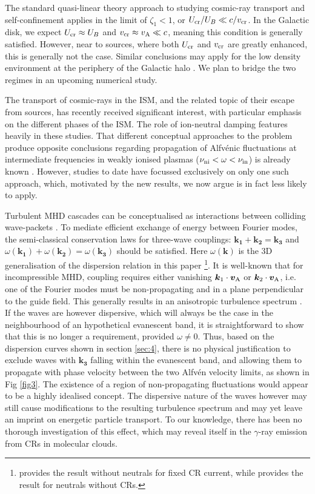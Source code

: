 \documentclass[a4paper,fleqn,usenatbib]{mnras}
\begin{document}
The standard quasi-linear theory approach to studying cosmic-ray transport and self-confinement applies in the limit of $\zeta_1<1$, or $U_{\rm cr}/U_B \ll c/v_{\rm cr}$. In the Galactic disk, we expect $U_{\rm cr} \approx U_B$ and $v_{\rm cr} \approx v_{\rm A} \ll c$, meaning this condition is generally satisfied. However, near to sources, where both $U_{\rm cr}$ and $v_{\rm cr}$ are greatly enhanced, this is generally not the case. 
Similar conclusions may apply for the low density environment at the periphery of the Galactic halo \cite[e.g.][]{BlasiAmato}. 
We plan to bridge the two regimes in an upcoming numerical study. 

The transport of cosmic-rays in the ISM, and the related topic of their  escape from sources, has recently received significant interest, with particular emphasis on the different phases of the ISM. The role of ion-neutral damping features heavily in these studies. That different conceptual approaches to the problem 
produce opposite conclusions regarding propagation of Alfv\'enic fluctuations at intermediate frequencies in weakly ionised plasmas ($\nu_{\rm ni} < 
\omega< \nu_{\rm in}$) is already known \citep{Tagger95,Soler}.  However, studies to date have focussed exclusively on only one such approach, which, motivated by the new results, we now argue is in fact less likely to apply. 

Turbulent MHD cascades can be conceptualised as interactions between colliding wave-packets \citep{Kraichnan}. To mediate efficient exchange of energy between Fourier modes, the semi-classical conservation laws for three-wave couplings: $\bm{k_1}+\bm{k_2}= \bm{k_3}$ and $\omega(\bm{k_1})+\omega(\bm{k_2})= \omega(\bm{k_3})$ should be satisfied.  
Here $\omega(\bm{k})$ is the 3D generalisation of the dispersion relation in this paper \footnote{ \citet{Bell2005} provides the result without neutrals for fixed CR current, while \citet{Soler} provides the result for neutrals without CRs.}. It is well-known that for incompressible MHD, coupling requires either vanishing $\bm{k}_1\cdot \bm{v}_{\rm A}$ or $\bm{k}_2\cdot \bm{v}_{\rm A}$, i.e. one of the Fourier modes must be non-propagating and in a plane perpendicular to the guide field. This generally results in an anisotropic turbulence spectrum \cite[see][for a review]{Zhou}. If the waves are however dispersive, which will always be the case in the neighbourhood of an hypothetical evanescent band, it is straightforward to show that this is no longer a requirement, provided $\omega \neq 0$. 
Thus, based on the dispersion curves shown in section \ref{sec:4}, there is no physical justification to exclude waves with $\bm{k_3}$ falling within the evanescent band, and allowing them to propagate with phase velocity between the two Alfv\'en velocity limits, as shown in Fig \ref{fig3}. The existence of a region of non-propagating fluctuations would appear to be a highly idealised concept. The dispersive nature of the waves however may still cause modifications to the resulting turbulence spectrum and may yet leave an imprint on energetic particle transport. To our knowledge, there has been no thorough investigation of this effect, which may reveal itself in the $\gamma$-ray emission from CRs in molecular clouds.
\end{document}
